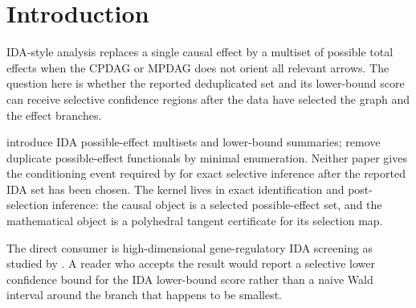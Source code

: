 \documentclass[11pt]{article}
\theoremstyle{definition}
\theoremstyle{plain}
\theoremstyle{remark}
\begin{document}
\section{Introduction}
IDA-style analysis replaces a single causal effect by a multiset of possible total effects when the CPDAG or MPDAG does not orient all relevant arrows. The question here is whether the reported deduplicated set and its lower-bound score can receive selective confidence regions after the data have selected the graph and the effect branches.

\citet{MaathuisKalischBuhlmann2009IDA} introduce IDA possible-effect multisets and lower-bound summaries; \citet{GuoPerkovic2021MinimalEnumeration} remove duplicate possible-effect functionals by minimal enumeration. Neither paper gives the conditioning event required by \citet[Section 2, Theorem 1]{LeeSunSunTaylor2016Polyhedral} for exact selective inference after the reported IDA set has been chosen. The kernel lives in exact identification and post-selection inference: the causal object is a selected possible-effect set, and the mathematical object is a polyhedral tangent certificate for its selection map.

The direct consumer is high-dimensional gene-regulatory IDA screening as studied by \citet{MaathuisKalischBuhlmann2009IDA}. A reader who accepts the result would report a selective lower confidence bound for the IDA lower-bound score rather than a naive Wald interval around the branch that happens to be smallest.
\end{document}
